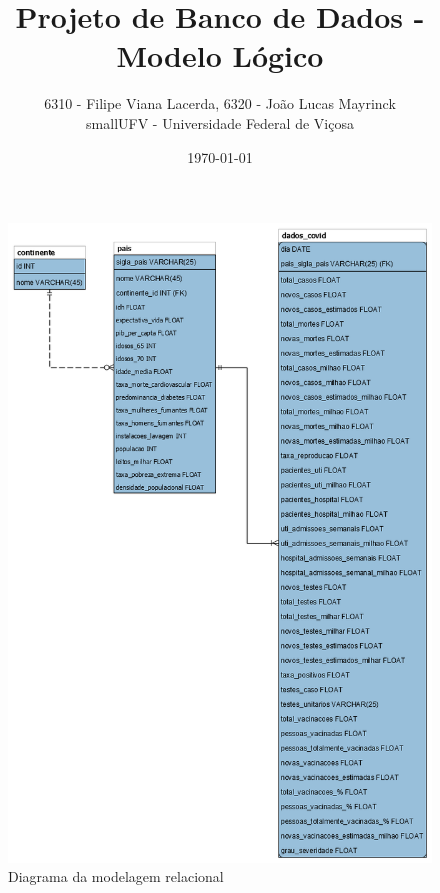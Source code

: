 \documentclass{article}
\title{Projeto de Banco de Dados - Modelo Lógico}
\author{6310 - Filipe Viana Lacerda, 6320 - João Lucas Mayrinck\\small{UFV - Universidade Federal de Viçosa}}
\date{\today}
\begin{document}
    \maketitle

    \begin{figure}
        
        \centering
        \includegraphics[scale=0.45]{MLR-semFundo.png}
        \caption{Diagrama da modelagem relacional}

    \end{figure}
    
\end{document}
